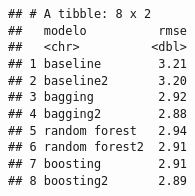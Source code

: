 \documentclass[
]{article}
\begin{document}
\begin{verbatim}
## # A tibble: 8 x 2
##   modelo          rmse
##   <chr>          <dbl>
## 1 baseline        3.21
## 2 baseline2       3.20
## 3 bagging         2.92
## 4 bagging2        2.88
## 5 random forest   2.94
## 6 random forest2  2.91
## 7 boosting        2.91
## 8 boosting2       2.89
\end{verbatim}
\end{document}
